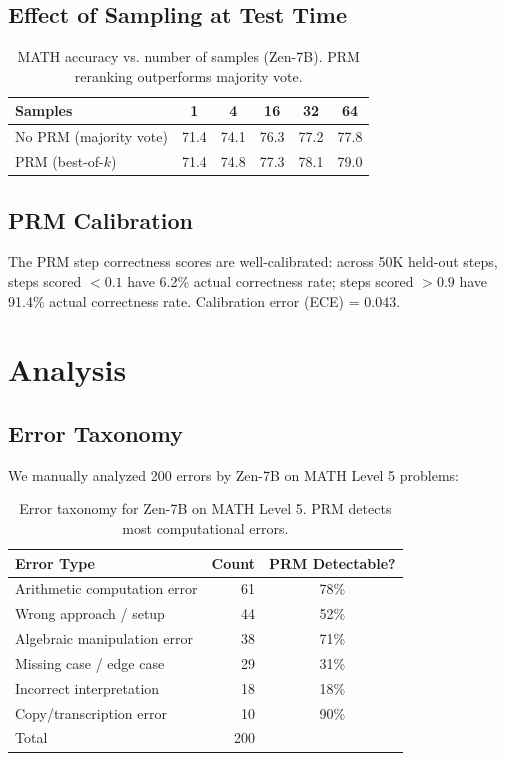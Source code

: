 \documentclass[11pt,a4paper]{article}
\begin{document}
\subsection{Effect of Sampling at Test Time}

\begin{table}[H]
\centering
\begin{tabular}{lccccc}
\toprule
\textbf{Samples} & \textbf{1} & \textbf{4} & \textbf{16} & \textbf{32} & \textbf{64} \\
\midrule
No PRM (majority vote) & 71.4 & 74.1 & 76.3 & 77.2 & 77.8 \\
PRM (best-of-$k$) & 71.4 & 74.8 & 77.3 & 78.1 & 79.0 \\
\bottomrule
\end{tabular}
\caption{MATH accuracy vs. number of samples (Zen-7B). PRM reranking outperforms majority vote.}
\label{tab:sampling}
\end{table}

\subsection{PRM Calibration}

The PRM step correctness scores are well-calibrated: across 50K held-out steps,
steps scored $<0.1$ have 6.2\% actual correctness rate; steps scored $>0.9$ have
91.4\% actual correctness rate. Calibration error (ECE) = 0.043.

\section{Analysis}

\subsection{Error Taxonomy}

We manually analyzed 200 errors by Zen-7B on MATH Level 5 problems:

\begin{table}[H]
\centering
\begin{tabular}{lrc}
\toprule
\textbf{Error Type} & \textbf{Count} & \textbf{PRM Detectable?} \\
\midrule
Arithmetic computation error & 61 & 78\% \\
Wrong approach / setup & 44 & 52\% \\
Algebraic manipulation error & 38 & 71\% \\
Missing case / edge case & 29 & 31\% \\
Incorrect interpretation & 18 & 18\% \\
Copy/transcription error & 10 & 90\% \\
\midrule
Total & 200 & \\
\bottomrule
\end{tabular}
\caption{Error taxonomy for Zen-7B on MATH Level 5. PRM detects most computational errors.}
\end{table}
\end{document}
